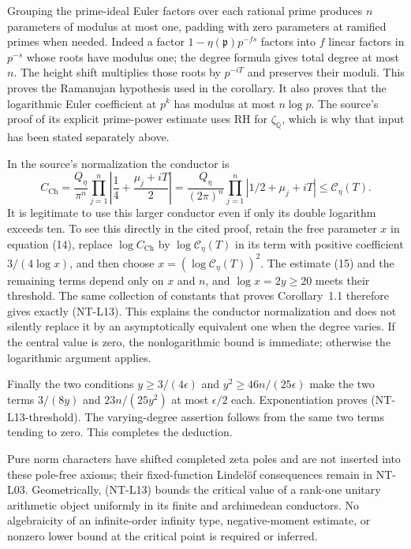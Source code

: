 \documentclass[11pt,a4paper]{article}
\begin{document}
Grouping the prime-ideal Euler factors over each rational
prime produces $n$ parameters of modulus at most one,
padding with zero parameters at ramified primes when needed.
Indeed a factor $1-\eta(\mathfrak p)p^{-fs}$ factors into
$f$ linear factors in $p^{-s}$ whose roots have modulus one;
the degree formula gives total degree at most $n$.
The height shift multiplies those roots by $p^{-iT}$ and
preserves their moduli.  This proves the Ramanujan hypothesis
used in the corollary.  It also proves that the logarithmic
Euler coefficient at $p^k$ has modulus at most $n\log p$.
The source's proof of its explicit prime-power estimate uses
RH for $\zeta_{\mathbb Q}$, which is why that input has been
stated separately above.

In the source's normalization the conductor is
\[
 C_{\mathrm{Ch}}=
 \frac{Q_\eta}{\pi^n}
        \prod_{j=1}^n\left|\frac14+
                              \frac{\mu_j+iT}{2}\right|
 =\frac{Q_\eta}{(2\pi)^n}
        \prod_{j=1}^n|1/2+\mu_j+iT|
 \le\mathscr C_\eta(T).
\]
It is legitimate to use this larger conductor even if only
its double logarithm exceeds ten.  To see this directly in
the cited proof, retain the free parameter $x$ in equation
(14), replace $\log C_{\mathrm{Ch}}$ by
$\log\mathscr C_\eta(T)$ in its term with positive
coefficient $3/(4\log x)$, and then choose
$x=(\log\mathscr C_\eta(T))^2$.
The estimate (15) and the remaining terms depend only on
$x$ and $n$, and $\log x=2y\ge20$ meets their threshold.
The same collection of constants that proves Corollary~1.1
therefore gives exactly (NT-L13).  This explains the conductor
normalization and does not silently replace it by an
asymptotically equivalent one when the degree varies.
If the central value is zero, the nonlogarithmic bound is
immediate; otherwise the logarithmic argument applies.

Finally the two conditions
$y\ge3/(4\epsilon)$ and
$y^2\ge46n/(25\epsilon)$ make the two terms
$3/(8y)$ and $23n/(25y^2)$ at most $\epsilon/2$ each.
Exponentiation proves (NT-L13-threshold).
The varying-degree assertion follows from the same two
terms tending to zero.  This completes the deduction.

Pure norm characters have shifted completed zeta poles and
are not inserted into these pole-free axioms; their fixed-function
Lindel\"of consequences remain in NT-L03.  Geometrically,
(NT-L13) bounds the critical value of a rank-one unitary
arithmetic object uniformly in its finite and archimedean
conductors.  No algebraicity of an infinite-order infinity
type, negative-moment estimate, or nonzero lower bound at the
critical point is required or inferred.
\end{document}
